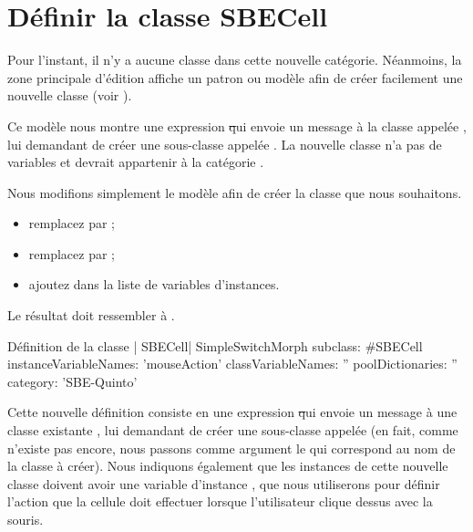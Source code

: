 \documentclass[a4paper,10pt,twoside]{book}
\begin{document}
\section{Définir la classe SBECell}

Pour l'instant, il n'y a aucune classe dans cette nouvelle
catégorie. Néanmoins, la zone principale d'édition affiche un
patron ou modèle afin de créer facilement une nouvelle classe (voir ).

Ce modèle nous montre une expression \st qui envoie un message à la classe appelée , lui demandant de créer une sous-classe appelée .  La nouvelle classe n'a pas de variables et devrait appartenir à la catégorie .

Nous modifions simplement le modèle afin de créer la classe que nous souhaitons.

\begin{itemize}
  \item remplacez  par ;
  \item remplacez  par ;
  \item ajoutez  dans la liste de variables d'instances.
\end{itemize}
Le résultat doit ressembler à .

\begin{classdef}[firstClassDef]{Définition de la classe \ct| SBECell|}
SimpleSwitchMorph subclass: #SBECell
   instanceVariableNames: 'mouseAction'
   classVariableNames: ''
   poolDictionaries: ''
   category: 'SBE-Quinto'
\end{classdef}

Cette nouvelle définition consiste en une expression \st qui envoie un message à une classe existante , lui demandant de créer une sous-classe appelée 
(en fait, comme  n'existe pas encore, nous passons comme argument le   qui correspond au nom de la classe à créer).
Nous indiquons également que les instances de cette nouvelle classe doivent avoir une variable d'instance , que nous utiliserons pour définir l'action que la cellule doit effectuer lorsque l'utilisateur clique dessus avec la souris.
\end{document}
